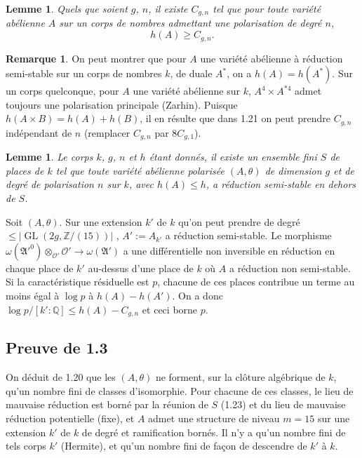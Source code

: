 \documentclass[12pt,a4paper]{article}
\theoremstyle{plain}
\newtheorem{lemma}[theorem]{Lemme}
\theoremstyle{definition}
\newtheorem{remark}[theorem]{Remarque}
\theoremstyle{remark}
\DeclareMathOperator{\GL}{GL}
\newcommand{\QQ}{\mathbb{Q}}
\newcommand{\ZZ}{\mathbb{Z}}
\newcommand{\cO}{\mathcal{O}}
\newcommand{\fA}{\mathfrak{A}}
\providecommand{\QQ}{\mathbb{Q}}
\providecommand{\ZZ}{\mathbb{Z}}
\providecommand{\cO}{\mathcal{O}}
\providecommand{\fA}{\mathfrak{A}}
\providecommand{\GL}{\operatorname{GL}}
\begin{document}
\begin{lemma}
Quels que soient $g$, $n$, il existe $C_{g,n}$ tel que pour toute variété abélienne $A$ sur un corps de nombres admettant une polarisation de degré $n$,
\[
h(A) \geq C_{g,n}.
\]
\end{lemma}

\begin{remark}
On peut montrer que pour $A$ une variété abélienne à réduction semi-stable sur un corps de nombres $k$, de duale $A^*$, on a $h(A) = h(A^*)$. Sur un corps quelconque, pour $A$ une variété abélienne sur $k$, $A^4 \times A^{*4}$ admet toujours une polarisation principale (Zarhin). Puisque $h(A \times B) = h(A) + h(B)$, il en résulte que dans 1.21 on peut prendre $C_{g,n}$ indépendant de $n$ (remplacer $C_{g,n}$ par $8C_{g,1}$).
\end{remark}

\begin{lemma}
Le corps $k$, $g$, $n$ et $h$ étant donnés, il existe un ensemble fini $S$ de places de $k$ tel que toute variété abélienne polarisée $(A,\theta)$ de dimension $g$ et de degré de polarisation $n$ sur $k$, avec $h(A) \leq h$, a réduction semi-stable en dehors de $S$.
\end{lemma}

Soit $(A,\theta)$. Sur une extension $k'$ de $k$ qu'on peut prendre de degré $\leq |\GL(2g, \ZZ/(15))|$ , $A' := A_{k'}$ a réduction semi-stable. Le morphisme $\omega(\fA'^0) \otimes_{\cO'} \cO' \to \omega(\fA')$ a une différentielle non inversible en réduction en chaque place de $k'$ au-dessus d'une place de $k$ où $A$ a réduction non semi-stable. Si la caractéristique résiduelle est $p$, chacune de ces places contribue un terme au moins égal à $\log p$ à $h(A) - h(A')$. On a donc $\log p/[k':\QQ] \leq h(A) - C_{g,n}$ et ceci borne $p$.

\subsection{Preuve de 1.3}

On déduit de 1.20 que les $(A,\theta)$ ne forment, sur la clôture algébrique de $k$, qu'un nombre fini de classes d'isomorphie. Pour chacune de ces classes, le lieu de mauvaise réduction est borné par la réunion de $S$ (1.23) et du lieu de mauvaise réduction potentielle (fixe), et $A$ admet une structure de niveau $m = 15$ sur une extension $k'$ de $k$ de degré et ramification bornés. Il n'y a qu'un nombre fini de tels corps $k'$ (Hermite), et qu'un nombre fini de façon de descendre de $k'$ à $k$.
\end{document}
